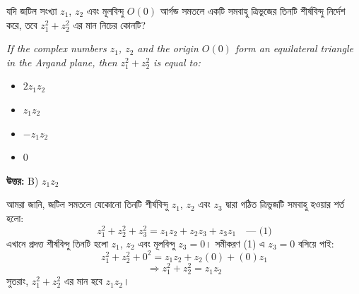\documentclass[12pt, a4paper]{article}
\begin{document}
\begin{tcolorbox}[questionbox={প্রশ্ন (Question) 8}]
    \noindent
    যদি জটিল সংখ্যা $z_1$, $z_2$ এবং মূলবিন্দু $O(0)$ আর্গন্ড সমতলে একটি সমবাহু ত্রিভুজের তিনটি শীর্ষবিন্দু নির্দেশ করে, তবে $z_1^2 + z_2^2$ এর মান নিচের কোনটি?
    
    \vspace{0.8em}
    \begin{english}
    \noindent\textit{\color{darkgray}
    If the complex numbers $z_1$, $z_2$ and the origin $O(0)$ form an equilateral triangle in the Argand plane, then $z_1^2 + z_2^2$ is equal to:
    }
    \end{english}
\end{tcolorbox}

\begin{itemize}[label={}, leftmargin=1cm, itemsep=0.5em]
    \item[\textbf{A)}] $2 z_1 z_2$
    \item[\textbf{B)}] $z_1 z_2$
    \item[\textbf{C)}] $-z_1 z_2$
    \item[\textbf{D)}] $0$
\end{itemize}

\vspace{0.5em}
\begin{tcolorbox}[answerbox]
    \textbf{\color{success} উত্তর:} B) $z_1 z_2$
\end{tcolorbox}
\vspace{1em}

\begin{tcolorbox}[solutionbox={সমাধান (Solution)}]
    \noindent
    আমরা জানি, জটিল সমতলে যেকোনো তিনটি শীর্ষবিন্দু $z_1$, $z_2$ এবং $z_3$ দ্বারা গঠিত ত্রিভুজটি সমবাহু হওয়ার শর্ত হলো:
    \[ z_1^2 + z_2^2 + z_3^2 = z_1 z_2 + z_2 z_3 + z_3 z_1 \quad \text{--- (1)} \]
    এখানে প্রদত্ত শীর্ষবিন্দু তিনটি হলো $z_1$, $z_2$ এবং মূলবিন্দু $z_3 = 0$। সমীকরণ (1) এ $z_3 = 0$ বসিয়ে পাই:
    \[ z_1^2 + z_2^2 + 0^2 = z_1 z_2 + z_2(0) + (0)z_1 \]
    \[ \Rightarrow z_1^2 + z_2^2 = z_1 z_2 \]
    সুতরাং, $z_1^2 + z_2^2$ এর মান হবে $z_1 z_2$।
\end{tcolorbox}
\end{document}
